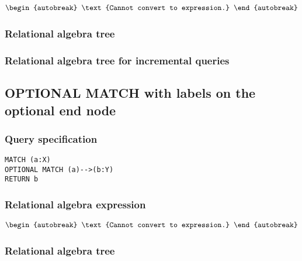 \begin{align*}
\begin{autobreak}
\text{Cannot convert to expression.}
\end{autobreak}
\end{align*}

\subsubsection*{Relational algebra tree}


\subsubsection*{Relational algebra tree for incremental queries}


\subsection{OPTIONAL MATCH with labels on the optional end node}

\subsubsection*{Query specification}

\begin{lstlisting}
MATCH (a:X)
OPTIONAL MATCH (a)-->(b:Y)
RETURN b
\end{lstlisting}

\subsubsection*{Relational algebra expression}

\begin{align*}
\begin{autobreak}
\text{Cannot convert to expression.}
\end{autobreak}
\end{align*}

\subsubsection*{Relational algebra tree}



